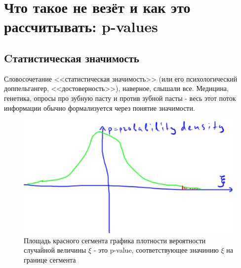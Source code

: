 \documentclass{book}
\begin{document}
 

\chapter[Что такое не везёт: p-values]{Что такое не везёт и как это рассчитывать: p-values}

\section*{Cтатистическая значимость}

Словосочетание <<статистическая значимость>> (или его психологический доппельгангер, <<достоверность>>), наверное, слышали все. Медицина, генетика, опросы про зубную пасту и против зубной пасты - весь этот поток информации обычно формализуется через понятие значимости. 

\begin{figure}
    \centering
    \includegraphics[scale=.5]{img/p-value.png}
    \caption{Площадь красного сегмента графика плотности вероятности случайной величины $\xi$ - это p-value, соответствующее значинию $\xi$ на границе сегмента}
    \label{pval}
\end{figure}



 
\end{document}
